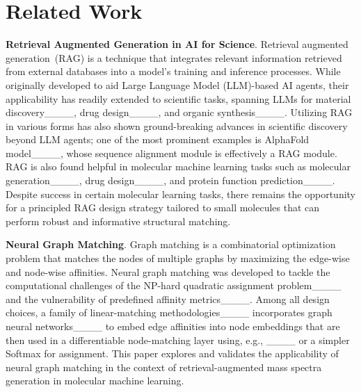 \section{Related Work}
\textbf{Retrieval Augmented Generation in AI for Science}.
Retrieval augmented generation~(RAG) is a technique that integrates relevant information retrieved from external databases into a model's training and inference processes. While originally developed to aid Large Language Model (LLM)-based AI agents, their applicability has readily extended to scientific tasks, spanning LLMs for material discovery____, drug design____, and organic synthesis____. Utilizing RAG in various forms  has also shown ground-breaking advances in scientific discovery beyond LLM agents; one of the most prominent examples is AlphaFold model____, whose sequence alignment module is effectively a RAG module. 
RAG is also found helpful in molecular machine learning tasks such as molecular generation____, drug design____, and protein function prediction____. Despite success in certain molecular learning tasks, there remains the opportunity for a principled RAG design strategy tailored to small molecules %
that can perform robust and informative structural matching. 


\textbf{Neural Graph Matching}.
Graph matching is a combinatorial optimization problem that matches the nodes of multiple graphs by maximizing the edge-wise and node-wise affinities. Neural graph matching was developed to tackle the computational challenges of the NP-hard quadratic assignment problem____ and the vulnerability of predefined affinity metrics____.
Among all design choices, a family of linear-matching  methodologies____ incorporates graph neural networks____ to embed edge affinities into node embeddings that are then used in a differentiable node-matching layer using, e.g., ____ or a simpler Softmax for assignment. 
This paper explores and validates the applicability of neural graph matching in the context of retrieval-augmented mass spectra generation in molecular machine learning.